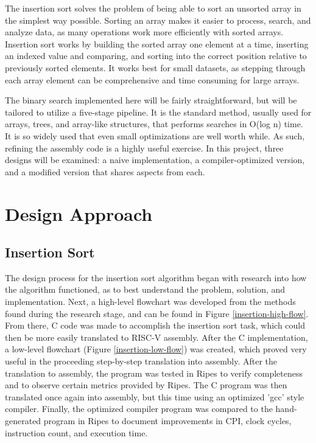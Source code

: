 \documentclass[lettersize,journal]{IEEEtran}
\begin{document}
    The insertion sort solves the problem of being able to sort an unsorted array in the simplest way possible. Sorting an array makes it easier to process, search, and analyze data, as many operations work more efficiently with sorted arrays. Insertion sort works by building the sorted array one element at a time, inserting an indexed value and comparing, and sorting into the correct position relative to previously sorted elements. It works best for small datasets, as stepping through each array element can be comprehensive and time consuming for large arrays. 

    The binary search implemented here will be fairly straightforward, but will be tailored to utilize a five-stage pipeline. It is the standard method, usually used for arrays, trees, and array-like structures, that performs searches in O(log n) time. It is so widely used that even small optimizations are well worth while. As such, refining the assembly code is a highly useful exercise. In this project, three designs will be examined: a naive implementation, a compiler-optimized version, and a modified version that shares aspects from each.

\section{Design Approach}
	\subsection{Insertion Sort}
\indent The design process for the insertion sort algorithm began with research into how the algorithm functioned, as to best understand the problem, solution, and implementation\cite{ref1}. Next, a high-level flowchart was developed from the methods found during the research stage, and can be found in Figure \ref{insertion-high-flow}. From there, C code was made to accomplish the insertion sort task, which could then be more easily translated to RISC-V assembly. After the C implementation, a low-level flowchart (Figure \ref{insertion-low-flow}) was created, which proved very useful in the proceeding step-by-step translation into assembly. After the translation to assembly, the program was tested in Ripes to verify completeness and to observe certain metrics provided by Ripes. The C program was then translated once again into assembly, but this time using an optimized 'gcc' style compiler. Finally, the optimized compiler program was compared to the hand-generated program in Ripes to document improvements in CPI, clock cycles, instruction count, and execution time. 
\end{document}

